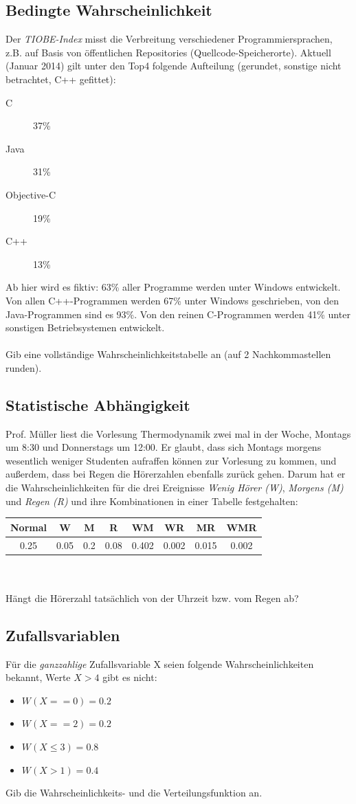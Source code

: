 \documentclass[11pt, a4paper]{article}
\begin{document}
\subsection{Bedingte Wahrscheinlichkeit}
Der \textit{TIOBE-Index} misst die Verbreitung verschiedener Programmiersprachen, z.B. auf Basis von öffentlichen Repositories (Quellcode-Speicherorte). Aktuell (Januar 2014) gilt unter den Top4 folgende Aufteilung (gerundet, sonstige nicht betrachtet, C++ gefittet):
\begin{description}
	\item[C] 37\%
	\item[Java] 31\%
	\item[Objective-C] 19\%
	\item[C++] 13\%
\end{description}
Ab hier wird es fiktiv: 63\% aller Programme werden unter Windows entwickelt. Von allen C++-Programmen werden 67\% unter Windows geschrieben, von den Java-Programmen sind es 93\%. Von den reinen C-Programmen werden 41\% unter sonstigen Betriebsystemen entwickelt. \\
\\
Gib eine vollständige Wahrscheinlichkeitstabelle an (auf 2 Nachkommastellen runden).

\subsection{Statistische Abhängigkeit}
Prof. Müller liest die Vorlesung Thermodynamik zwei mal in der Woche, Montags um 8:30 und Donnerstags um 12:00. Er glaubt, dass sich Montags morgens wesentlich weniger Studenten aufraffen können zur Vorlesung zu kommen, und außerdem, dass bei Regen die Hörerzahlen ebenfalls zurück gehen. Darum hat er die Wahrscheinlichkeiten für die drei Ereignisse \emph{Wenig Hörer (W)}, \emph{Morgens (M)} und \emph{Regen (R)} und ihre Kombinationen in einer Tabelle festgehalten: \\

\begin{tabular}{c|c|c|c|c|c|c|c}
	Normal & W & M & R & WM & WR & MR & WMR \\ \hline
	0.25 & 0.05 & 0.2 & 0.08 & 0.402 & 0.002 & 0.015 & 0.002
\end{tabular} \\
\\
Hängt die Hörerzahl tatsächlich von der Uhrzeit bzw. vom Regen ab?

\subsection{Zufallsvariablen}
Für die \emph{ganzzahlige} Zufallsvariable X seien folgende Wahrscheinlichkeiten bekannt, Werte $X > 4$ gibt es nicht:
\begin{itemize}
	\item $W(X == 0) = 0.2$
	\item $W(X == 2) = 0.2$
	\item $W(X \leq 3) = 0.8$
	\item $W(X > 1) = 0.4$
\end{itemize}
Gib die Wahrscheinlichkeits- und die Verteilungsfunktion an.
\end{document}
